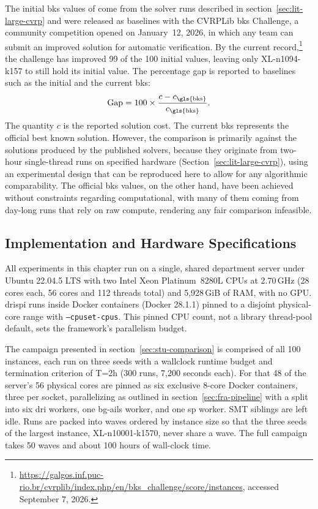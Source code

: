 The initial \gls{bks} values of \citet{queirogaXLInstancesCapacitated2026} come from the solver
runs described in section~\ref{sec:lit-large-cvrp} and were released as baselines with the
CVRPLib \gls{bks} Challenge, a community competition opened on January~12, 2026, in
which any team can submit an improved solution for automatic verification. By
the current record,\footnote{\url{https://galgos.inf.puc-rio.br/cvrplib/index.php/en/bks_challenge/score/instances}, accessed September 7, 2026.} the challenge has improved 99 of the 100
initial values, leaving only XL-n1094-k157 to still hold its initial value. The
percentage gap is reported to baselines such as the initial and the current \gls{bks}:
\begin{equation}
\mathrm{Gap} = 100 \times \frac{c - c_{\text{\gls{bks}}}}{c_{\text{\gls{bks}}}}.
\label{eq:gap}
\end{equation}
The quantity $c$ is the reported solution cost. The current
\gls{bks} represents the official best known solution. However, the comparison is primarily against the solutions produced by the published solvers, because they originate from two-hour single-thread runs on specified hardware
(Section~\ref{sec:lit-large-cvrp}), using an experimental design that can be reproduced here to allow for any algorithmic comparability. The official \gls{bks} values, on the other hand, have been achieved without constraints regarding computational, with many of them coming from day-long runs that rely on raw compute, rendering any fair comparison infeasible.

\subsection{Implementation and Hardware Specifications}\label{sec:stu-implementation}
All experiments in this chapter run on a single, shared department server under
Ubuntu 22.04.5 LTS with two Intel Xeon Platinum~8280L CPUs at 2.70\,GHz
(28 cores each, 56 cores and 112 threads total) and 5,928\,GiB of RAM, with no
GPU\@. \gls{drispi} runs inside Docker containers (Docker 28.1.1) pinned to a disjoint physical-core range with \texttt{--cpuset-cpus}. This pinned CPU count, not a library thread-pool default, sets the framework's parallelism budget.

The campaign presented in section~\ref{sec:stu-comparison} is comprised of all 100 instances, each run on three seeds with a wallclock runtime budget and termination criterion of T=2h (300 runs, 7{,}200 seconds each). For that 48 of the server's 56 physical cores are pinned as six exclusive 8-core Docker containers, three per socket, parallelizing as outlined in section~\ref{sec:fra-pipeline} with a split into six \gls{dri} workers, one \gls{bg-ails} worker, and one \gls{sp} worker. SMT siblings are left idle. Runs are packed into waves ordered by instance size so that the three seeds of the largest instance, XL-n10001-k1570, never share a wave. The full campaign takes 50 waves and about 100 hours of wall-clock time.

